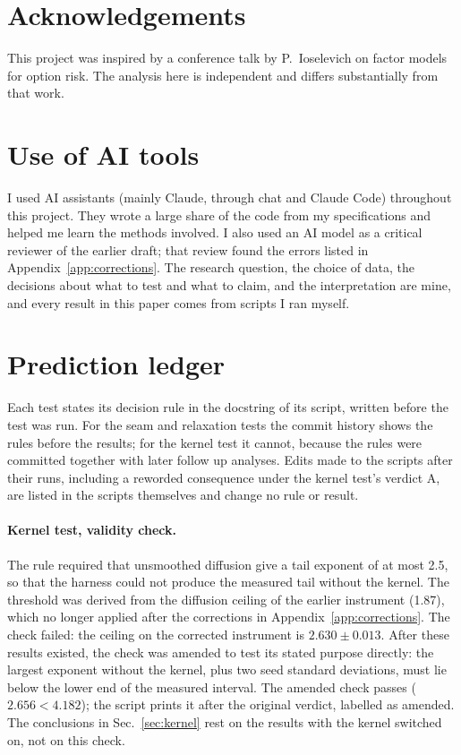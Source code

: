 \documentclass[11pt]{article}
\begin{document}
\section*{Acknowledgements}

This project was inspired by a conference talk by P.~Ioselevich on factor models for option risk. The analysis here is independent and differs substantially from that work.

\section*{Use of AI tools}

I used AI assistants (mainly Claude, through chat and Claude Code) throughout this project. They wrote a large share of the code from my specifications and helped me learn the methods involved. I also used an AI model as a critical reviewer of the earlier draft; that review found the errors listed in Appendix~\ref{app:corrections}. The research question, the choice of data, the decisions about what to test and what to claim, and the interpretation are mine, and every result in this paper comes from scripts I ran myself.

\appendix

\section{Prediction ledger}
\label{app:ledger}

Each test states its decision rule in the docstring of its script, written before the test was run. For the seam and relaxation tests the commit history shows the rules before the results; for the kernel test it cannot, because the rules were committed together with later follow up analyses. Edits made to the scripts after their runs, including a reworded consequence under the kernel test's verdict A, are listed in the scripts themselves and change no rule or result.

\paragraph{Kernel test, validity check.} The rule required that unsmoothed diffusion give a tail exponent of at most 2.5, so that the harness could not produce the measured tail without the kernel. The threshold was derived from the diffusion ceiling of the earlier instrument (1.87), which no longer applied after the corrections in Appendix~\ref{app:corrections}. The check failed: the ceiling on the corrected instrument is $2.630\pm0.013$. After these results existed, the check was amended to test its stated purpose directly: the largest exponent without the kernel, plus two seed standard deviations, must lie below the lower end of the measured interval. The amended check passes ($2.656<4.182$); the script prints it after the original verdict, labelled as amended. The conclusions in Sec.~\ref{sec:kernel} rest on the results with the kernel switched on, not on this check.
\end{document}
